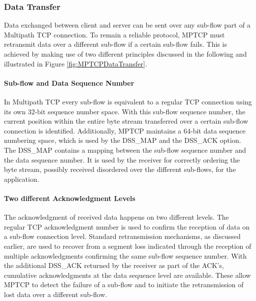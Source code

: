 \subsubsection{Data Transfer}

Data exchanged between client and server can be sent over any sub-flow part of a Multipath TCP connection. To remain a reliable protocol, MPTCP must retransmit data over a different sub-flow if a certain sub-flow fails. This is achieved by making use of two different principles discussed in the following and illustrated in Figure \ref{fig:MPTCPDataTransfer}.

\paragraph{Sub-flow and Data Sequence Number}

In Multipath TCP every sub-flow is equivalent to a regular TCP connection using its own 32-bit sequence number space. With this sub-flow sequence number, the current position within the entire byte stream transferred over a certain sub-flow connection is identified. Additionally, MPTCP maintains a 64-bit data sequence numbering space, which is used by the DSS\_MAP and the DSS\_ACK option. The DSS\_MAP contains a mapping between the sub-flow sequence number and the data sequence number. It is used by the receiver for correctly ordering the byte stream, possibly received disordered over the different sub-flows, for the application.

\paragraph{Two different Acknowledgment Levels}

The acknowledgment of received data happens on two different levels. The regular TCP acknowledgment number is used to confirm the reception of data on a sub-flow connection level. Standard retransmission mechanisms, as discussed earlier, are used to recover from a segment loss indicated through the reception of multiple acknowledgments confirming the same sub-flow sequence number. With the additional DSS\_ACK returned by the receiver as part of the ACK's, cumulative acknowledgments at the data sequence level are available. These allow MPTCP to detect the failure of a sub-flow and to initiate the retransmission of lost data over a different sub-flow.

